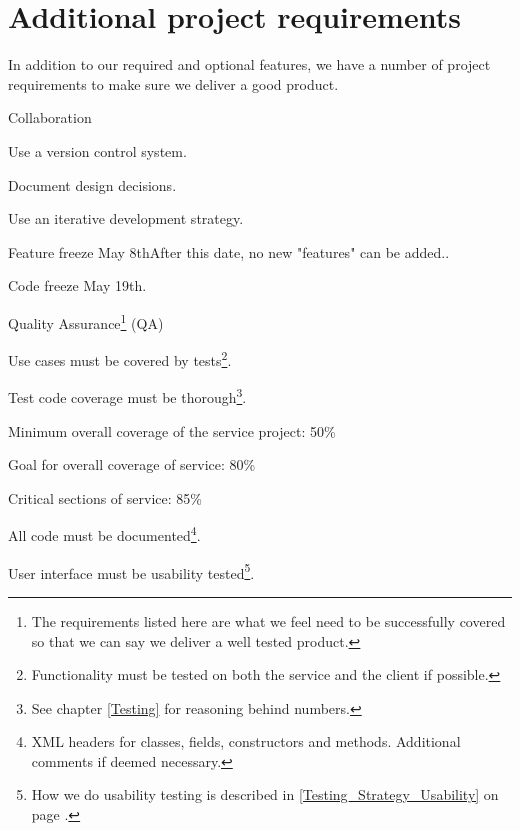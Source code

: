 \section{Additional project requirements}
\label{Requirements_Additional}
In addition to our required and optional features, we have a number of project requirements to make sure we deliver a good product. 
\begin{my_itemize}
	\item Collaboration 
	\begin{my_itemize}
		\item Use a version control system.
		\item Document design decisions.
		\item Use an iterative development strategy.
 		\item Feature freeze May 8th{After this date, no new "features" can be added.}.
		\item Code freeze May 19th.
	\end{my_itemize}
	\item Quality Assurance\footnote{The requirements listed here are what we feel need to be successfully covered so that we can say we deliver a well tested product.} (QA)
	\begin{my_itemize}
		\item Use cases must be covered by tests\footnote{Functionality must be tested on both the service and the client if possible.}.
		\item Test code coverage must be thorough\footnote{See chapter \ref{Testing}  for reasoning behind	numbers.}.
		\begin{my_itemize}
			\item Minimum overall coverage of the service project: 50\%
			\item Goal for overall coverage of service: 80\%
			\item Critical sections of service: 85\%
		\end{my_itemize}
		\item All code must be documented\footnote{XML headers for classes, fields, constructors and methods. Additional comments if deemed necessary.}.
		\item User interface must be usability tested\footnote{How we do usability testing is described in \ref{Testing_Strategy_Usability} on page \pageref{Testing_Strategy_Usability}.}.
	\end{my_itemize}
\end{my_itemize}

